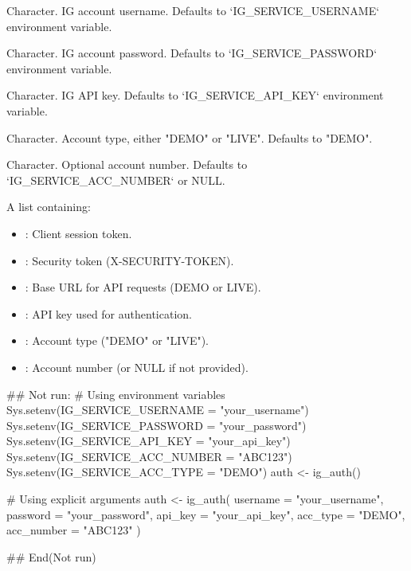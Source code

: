 \documentclass[a4paper]{book}
\begin{document}
\begin{Arguments}
\begin{ldescription}
\item[\code{username}] Character. IG account username. Defaults to `IG\_SERVICE\_USERNAME` environment variable.

\item[\code{password}] Character. IG account password. Defaults to `IG\_SERVICE\_PASSWORD` environment variable.

\item[\code{api\_key}] Character. IG API key. Defaults to `IG\_SERVICE\_API\_KEY` environment variable.

\item[\code{acc\_type}] Character. Account type, either "DEMO" or "LIVE". Defaults to "DEMO".

\item[\code{acc\_number}] Character. Optional account number. Defaults to `IG\_SERVICE\_ACC\_NUMBER` or NULL.
\end{ldescription}
\end{Arguments}
%
\begin{Value}
A list containing:
\begin{itemize}

\item{} : Client session token.
\item{} : Security token (X-SECURITY-TOKEN).
\item{} : Base URL for API requests (DEMO or LIVE).
\item{} : API key used for authentication.
\item{} : Account type ("DEMO" or "LIVE").
\item{} : Account number (or NULL if not provided).

\end{itemize}

\end{Value}
%
\begin{Examples}
\begin{ExampleCode}
## Not run: 
# Using environment variables
Sys.setenv(IG_SERVICE_USERNAME = "your_username")
Sys.setenv(IG_SERVICE_PASSWORD = "your_password")
Sys.setenv(IG_SERVICE_API_KEY = "your_api_key")
Sys.setenv(IG_SERVICE_ACC_NUMBER = "ABC123")
Sys.setenv(IG_SERVICE_ACC_TYPE = "DEMO")
auth <- ig_auth()

# Using explicit arguments
auth <- ig_auth(
  username = "your_username",
  password = "your_password",
  api_key = "your_api_key",
  acc_type = "DEMO",
  acc_number = "ABC123"
)

## End(Not run)

\end{ExampleCode}
\end{Examples}
\end{document}
